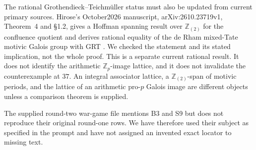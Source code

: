 \documentclass[11pt,a4paper]{article}
\theoremstyle{definition}
\begin{document}
The rational Grothendieck--Teichm\"uller status must also be updated from current primary sources. Hirose's October2026 manuscript, arXiv:2610.23719v1, Theorem~4 and \S1.2, gives a Hoffman spanning result over $\mathbb Z_{(2)}$ for the confluence quotient and derives rational equality of the de Rham mixed-Tate motivic Galois group with GRT \cite{Hirose2026}. We checked the statement and its stated implication, not the whole proof. This is a separate current rational result. It does not identify the arithmetic $\mathbb Z_p$-image lattice, and it does not invalidate the counterexample at $37$. An integral associator lattice, a $\mathbb Z_{(2)}$-span of motivic periods, and the lattice of an arithmetic pro-$p$ Galois image are different objects unless a comparison theorem is supplied.

The supplied round-two war-game file mentions B3 and S9 but does not reproduce their original round-one rows. We have therefore used their subject as specified in the prompt and have not assigned an invented exact locator to missing text.

\end{document}
